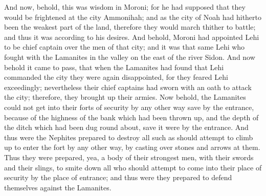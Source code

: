 And now, behold, this was wisdom in Moroni; for he had supposed that they would be frightened at the city Ammonihah; and as the city of Noah had hitherto been the weakest part of the land, therefore they would march thither to battle; and thus it was according to his desires.
\bverse \iffalse And behold, Moroni had appointed Lehi to be chief captain over the men of that city; and it was that same Lehi who fought with the Lamanites in the valley on the east of the river Sidon. \fi
And behold, Moroni had appointed Lehi to be chief captain over the men of that city; and it was that same Lehi who fought with the Lamanites in the valley on the east of the river Sidon.
\bverse \iffalse And now behold it came to pass, that when the Lamanites had found that Lehi commanded the city they were again disappointed, for they feared Lehi exceedingly; nevertheless their chief captains had sworn with an oath to attack the city; therefore, they brought up their armies. \fi
And now behold it came to pass, that when the Lamanites had found that Lehi commanded the city they were again disappointed, for they feared Lehi exceedingly; nevertheless their chief captains had sworn with an oath to attack the city; therefore, they brought up their armies.
\bverse \iffalse Now behold, the Lamanites could not get into their forts of security by any other way save by the entrance, because of the highness of the bank which had been thrown up, and the depth of the ditch which had been dug round about, save it were by the entrance. \fi
Now behold, the Lamanites could not get into their forts of security by any other way save by the entrance, because of the highness of the bank which had been thrown up, and the depth of the ditch which had been dug round about, save it were by the entrance.
\bverse \iffalse And thus were the Nephites prepared to destroy all such as should attempt to climb up to enter the fort by any other way, by casting over stones and arrows at them. \fi
And thus were the Nephites prepared to destroy all such as should attempt to climb up to enter the fort by any other way, by casting over stones and arrows at them.
\bverse \iffalse Thus they were prepared, yea, a body of their strongest men, with their swords and their slings, to smite down all who should attempt to come into their place of security by the place of entrance; and thus were they prepared to defend themselves against the Lamanites. \fi
Thus they were prepared, yea, a body of their strongest men, with their swords and their slings, to smite down all who should attempt to come into their place of security by the place of entrance; and thus were they prepared to defend themselves against the Lamanites.
